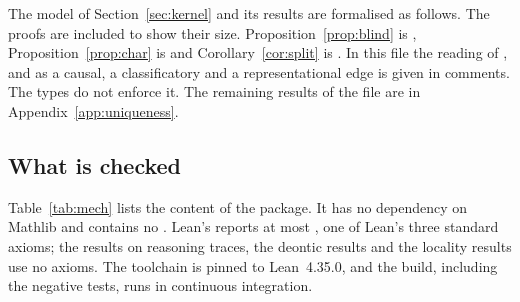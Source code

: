 The model of Section~\ref{sec:kernel} and its results are formalised as follows. The
proofs are included to show their size. Proposition~\ref{prop:blind} is
, Proposition~\ref{prop:char} is
 and Corollary~\ref{cor:split} is
. In this file the reading of ,
 and  as a causal, a classificatory and a representational
edge is given in comments. The types do not enforce it. The remaining results of the
file are in Appendix~\ref{app:uniqueness}.



\subsection{What is checked}

Table~\ref{tab:mech} lists the content of the package. It has no dependency on Mathlib
and contains no . Lean's  reports at most
, one of Lean's three standard axioms; the results on reasoning traces,
the deontic results and the locality results use no axioms. The toolchain is pinned to
Lean~4.35.0, and the build, including the negative tests, runs in continuous
integration.

